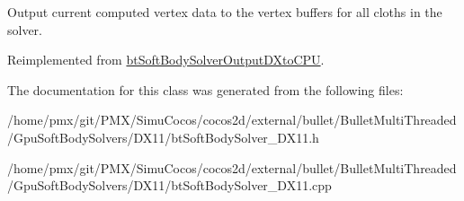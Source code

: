 Output current computed vertex data to the vertex buffers for all cloths in the solver. 

Reimplemented from \hyperlink{classbtSoftBodySolverOutputDXtoCPU_a0106bf90eec43326254607cab4a10478}{bt\+Soft\+Body\+Solver\+Output\+D\+Xto\+C\+PU}.



The documentation for this class was generated from the following files\+:\begin{DoxyCompactItemize}
\item 
/home/pmx/git/\+P\+M\+X/\+Simu\+Cocos/cocos2d/external/bullet/\+Bullet\+Multi\+Threaded/\+Gpu\+Soft\+Body\+Solvers/\+D\+X11/bt\+Soft\+Body\+Solver\+\_\+\+D\+X11.\+h\item 
/home/pmx/git/\+P\+M\+X/\+Simu\+Cocos/cocos2d/external/bullet/\+Bullet\+Multi\+Threaded/\+Gpu\+Soft\+Body\+Solvers/\+D\+X11/bt\+Soft\+Body\+Solver\+\_\+\+D\+X11.\+cpp\end{DoxyCompactItemize}
